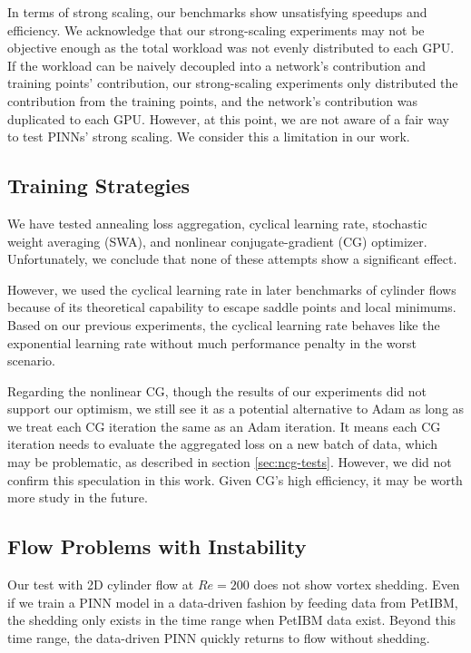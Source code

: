 In terms of strong scaling, our benchmarks show unsatisfying speedups and efficiency.
We acknowledge that our strong-scaling experiments may not be objective enough as the total workload was not evenly distributed to each GPU.
If the workload can be naively decoupled into a network's contribution and training points' contribution, our strong-scaling experiments only distributed the contribution from the training points, and the network's contribution was duplicated to each GPU.
However, at this point, we are not aware of a fair way to test PINNs' strong scaling.
We consider this a limitation in our work.

\subsection*{Training Strategies}

We have tested annealing loss aggregation, cyclical learning rate, stochastic weight averaging (SWA), and nonlinear conjugate-gradient (CG) optimizer.
Unfortunately, we conclude that none of these attempts show a significant effect.

However, we used the cyclical learning rate in later benchmarks of cylinder flows because of its theoretical capability to escape saddle points and local minimums.
Based on our previous experiments, the cyclical learning rate behaves like the exponential learning rate without much performance penalty in the worst scenario.

Regarding the nonlinear CG, though the results of our experiments did not support our optimism, we still see it as a potential alternative to Adam as long as we treat each CG iteration the same as an Adam iteration.
It means each CG iteration needs to evaluate the aggregated loss on a new batch of data, which may be problematic, as described in section \ref{sec:ncg-tests}. 
However, we did not confirm this speculation in this work.
Given CG's high efficiency, it may be worth more study in the future.

\subsection*{Flow Problems with Instability}

Our test with 2D cylinder flow at $Re=200$ does not show vortex shedding. 
Even if we train a PINN model in a data-driven fashion by feeding data from PetIBM, the shedding only exists in the time range when PetIBM data exist.
Beyond this time range, the data-driven PINN quickly returns to flow without shedding.


